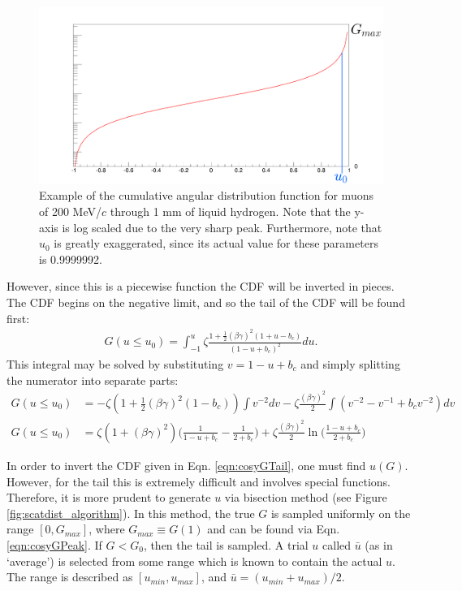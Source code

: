 \begin{figure}
  \centering
    \includegraphics[width=\textwidth]{Figures/scatdist_example} 
  \caption{Example of the cumulative angular distribution function for muons of 200 MeV/$c$ through 1 mm of liquid hydrogen. Note that the y-axis is log scaled due to the very sharp peak. Furthermore, note that $u_0$ is greatly exaggerated, since its actual value for these parameters is 0.9999992.}
  \label{fig:scatdist_example}
\end{figure}

However, since this is a piecewise function the CDF will be inverted in pieces. The CDF begins on the negative limit, and so the tail of the CDF will be found first:
\begin{align*}
G(u\leq u_0)=\int _{-1} ^u \zeta \frac{1+\frac{1}{2}(\beta\gamma)^2 (1+u-b_c)}{(1-u+b_c)^2} du.
\end{align*}
This integral may be solved by substituting $v=1-u+b_c$ and simply splitting the numerator into separate parts:
\begin{align}
\nonumber
G(u\leq u_0)&=-\zeta(1+\frac{1}{2}(\beta\gamma)^2(1-b_c))\int v^{-2} dv - \zeta \frac{(\beta\gamma)^2}{2}\int (v^{-2} - v^{-1} + b_c v^{-2}) dv\\
G(u\leq u_0)&=\zeta(1+(\beta\gamma)^2)\Big(\frac{1}{1-u+b_c} - \frac{1}{2+b_c}\Big)+\zeta \frac{(\beta\gamma)^2}{2} \ln\Big(\frac{1-u+b_c}{2+b_c}\Big) \label{eqn:cosyGTail}
\end{align}

In order to invert the CDF given in Eqn. \ref{eqn:cosyGTail}, one must find $u(G)$. However, for the tail this is extremely difficult and involves special functions. Therefore, it is more prudent to generate  $u$ via bisection method (see Figure \ref{fig:scatdist_algorithm}). In this method, the true $G$ is sampled uniformly on the range $[0,G_{max}]$, where $G_{max} \equiv G(1)$ and can be found via Eqn. \ref{eqn:cosyGPeak}.  If $G < G_0$, then the tail is sampled. A trial $u$ called $\bar{u}$ (as in `average') is selected from some range which is known to contain the actual $u$. The range is described as $[u_{min},u_{max}]$, and $\bar{u}=(u_{min}+u_{max})/2$. 

